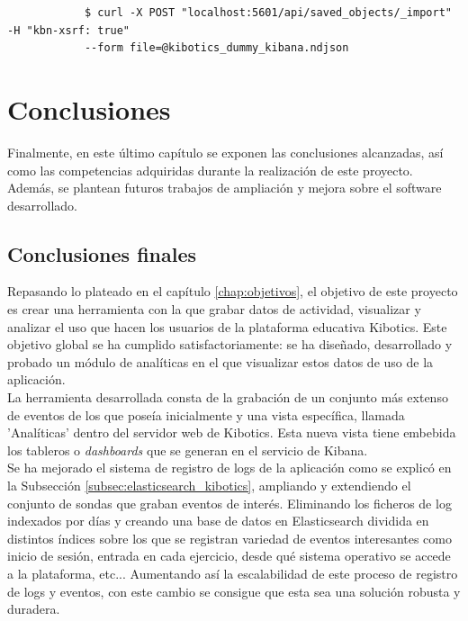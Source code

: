 \documentclass[a4paper, 12pt]{book}
\begin{document}
		
		{\footnotesize
		\begin{verbatim}
			$ curl -X POST "localhost:5601/api/saved_objects/_import" -H "kbn-xsrf: true" 
			--form file=@kibotics_dummy_kibana.ndjson
		\end{verbatim}
		}


	\cleardoublepage 
	\chapter{Conclusiones} 
	\label{chap:conclusiones} 
		Finalmente, en este último capítulo se exponen las conclusiones alcanzadas, así como las competencias adquiridas durante la realización de este proyecto. Además, se plantean futuros trabajos de ampliación y mejora sobre el software desarrollado.
	
	\section{Conclusiones finales} 
	\label{sec:conclusiones_finales} 

		Repasando lo plateado en el capítulo \ref{chap:objetivos}, el objetivo de este proyecto es crear una herramienta con la que grabar datos de actividad, visualizar y analizar el uso que hacen los usuarios de la plataforma educativa Kibotics. Este objetivo global se ha cumplido satisfactoriamente: se ha diseñado, desarrollado y probado un módulo de analíticas en el que visualizar estos datos de uso de la aplicación.\\
		
		La herramienta desarrollada consta de la grabación de un conjunto más extenso de eventos de los que poseía inicialmente y una vista específica, llamada 'Analíticas' dentro del servidor web de Kibotics. Esta nueva vista tiene embebida los tableros o \textit{dashboards} que se generan en el servicio de Kibana.\\
		
		Se ha mejorado el sistema de registro de logs de la aplicación como se explicó en la Subsección \ref{subsec:elasticsearch_kibotics}, ampliando y extendiendo el conjunto de sondas que graban eventos de interés. Eliminando los ficheros de log indexados por días y creando una base de datos en Elasticsearch dividida en distintos índices sobre los que se registran variedad de eventos interesantes como inicio de sesión, entrada en cada ejercicio, desde qué sistema operativo se accede a la plataforma, etc... Aumentando así la escalabilidad de este proceso de registro de logs y eventos, con este cambio se consigue que esta sea una solución robusta y duradera.\\
	
\end{document}

